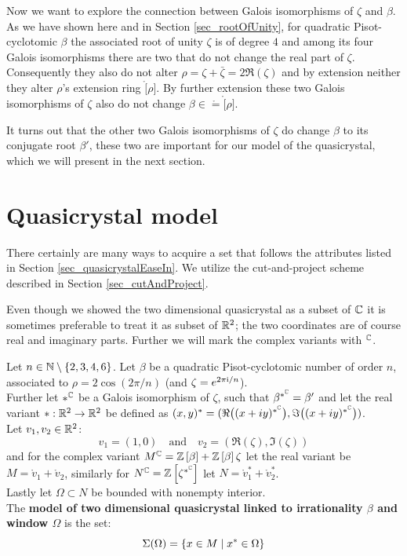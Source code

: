 \documentclass[text.tex]{subfiles}
\begin{document}
Now we want to explore the connection between Galois isomorphisms of $\zeta$ and $\beta$. As we have shown here and in Section \ref{sec_rootOfUnity}, for quadratic Pisot-cyclotomic $\beta$ the associated root of unity $\zeta$ is of degree $4$ and among its four Galois isomorphisms there are two that do not change the real part of $\zeta$. Consequently they also do not alter $\rho = \zeta +\bar{\zeta} = 2\Re{(\zeta)}$ and by extension neither they alter $\rho$'s extension ring $\ring[\rho]$. By further extension these two Galois isomorphisms of $\zeta$ also do not change $\beta\in\ring=\ring[\rho]$. 

It turns out that the other two Galois isomorphisms of $\zeta$ do change $\beta$ to its conjugate root $\beta'$, these two are important for our model of the quasicrystal, which we will present in the next section. 

\section{Quasicrystal model}%
There certainly are many ways to acquire a set that follows the attributes listed in Section \ref{sec_quasicrystalEaseIn}. We utilize the cut-and-project scheme described in Section \ref{sec_cutAndProject}. 

Even though we showed the two dimensional quasicrystal as a subset of $\mathbb{C}$ it is sometimes preferable to treat it as subset of $\mathbb{R}^2$; the two coordinates are of course real and imaginary parts. Further we will mark the complex variants with ${}^{\mathbb{C}}$. 

\begin{definition}\label{def_quasicrystal}
Let $n\in\mathbb{N}\setminus\{2,3,4,6\}$. Let $\beta$ be a quadratic Pisot-cyclotomic number of order $n$, associated to $\rho = 2\cos\left(2\pi/n\right)$ (and $\zeta = e^{2\pi \mathrm{i}/n}$). \\
Further let $\ast^{\mathbb{C}}$ be a Galois isomorphism of $\zeta$, such that $\beta^{\ast^{\mathbb{C}}} = \beta'$ and let the real variant $\ast:\mathbb{R}^2\to\mathbb{R}^2$ be defined as $(x,y)^\ast = (\Re{\big((x+iy)^{\ast^{\mathbb{C}}}\big)}, \Im{\big((x+iy)^{\ast^{\mathbb{C}}}\big)})$. \\
Let $v_1, v_2\in\mathbb{R}^2$:
$$v_1=(1,0)\quad\text{and}\quad v_2 = (\Re{(\zeta)}, \Im{(\zeta)})$$
and for the complex variant $M^{\mathbb{C}} = \mathbb{Z}\left[\beta\right]+\mathbb{Z}\left[\beta\right]\zeta$ let the real variant be $M = \ring v_1+\ring v_2$, similarly for $N^{\mathbb{C}}=\mathbb{Z}\left[\zeta^{\ast^{\mathbb{C}}}\right]$ let $N = \ring v_1^\ast+\ring v_2^\ast$.\\
Lastly let $\Omega\subset N$ be bounded with nonempty interior. \\
The \textbf{model of two dimensional quasicrystal linked to irrationality $\beta$ and window $\Omega$} is the set:
$$\Sigma(\Omega) = \{ x \in M\; |\; x^\ast\in \Omega\}$$
\end{definition}
\end{document}
